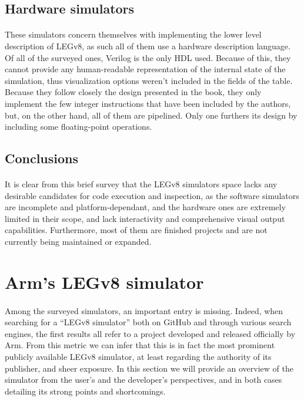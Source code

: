 \subsection{Hardware simulators}
\paragraph{}
These simulators concern themselves with implementing the lower level description of LEGv8, as such all of them use a hardware description language. Of all of the surveyed ones, Verilog is the only HDL used. Because of this, they cannot provide any human-readable representation of the internal state of the simulation, thus visualization options weren't included in the fields of the table. Because they follow closely the design presented in the book, they only implement the few integer instructions that have been included by the authors, but, on the other hand, all of them are pipelined. Only one furthers its design by including some floating-point operations.

\subsection{Conclusions}
\paragraph{}
It is clear from this brief survey that the LEGv8 simulators space lacks any desirable candidates for code execution and inspection, as the software simulators are incomplete and platform-dependant, and the hardware ones are extremely limited in their scope, and lack interactivity and comprehensive visual output capabilities. Furthermore, most of them are finished projects and are not currently being maintained or expanded.

\section{Arm's LEGv8 simulator} \label{chap:chap1simoverview}
\paragraph{}
Among the surveyed simulators, an important entry is missing. Indeed, when searching for a ``LEGv8 simulator'' both on GitHub and through various search engines, the first results all refer to a project \cite{legv8simARMrepo} developed and released officially by Arm. From this metric we can infer that this is in fact the most prominent publicly available LEGv8 simulator, at least regarding the authority of its publisher, and sheer exposure. In this section we will provide an overview of the simulator from the user's and the developer's perspectives, and in both cases detailing its strong points and shortcomings.

